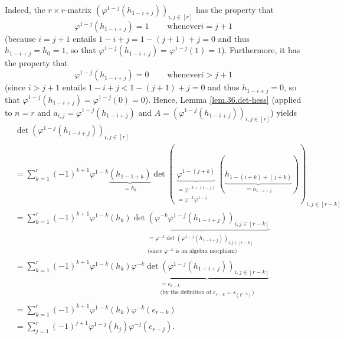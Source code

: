 \documentclass[numbers=enddot,12pt,final,onecolumn,notitlepage]{scrartcl}%
\theoremstyle{definition}
\let\sumnonlimits\sum
\renewcommand{\sum}{\sumnonlimits\limits}
\begin{document}
\begin{enumerate}
Indeed, the $r\times r$-matrix $\left(  \varphi^{1-j}\left(  h_{1-i+j}\right)
\right)  _{i,j\in\left[  r\right]  }$ has the property that%
\[
\varphi^{1-j}\left(  h_{1-i+j}\right)  =1\ \ \ \ \ \ \ \ \ \ \text{whenever
}i=j+1
\]
(because $i=j+1$ entails $1-i+j=1-\left(  j+1\right)  +j=0$ and thus
$h_{1-i+j}=h_{0}=1$, so that $\varphi^{1-j}\left(  h_{1-i+j}\right)
=\varphi^{1-j}\left(  1\right)  =1$). Furthermore, it has the property that%
\[
\varphi^{1-j}\left(  h_{1-i+j}\right)  =0\ \ \ \ \ \ \ \ \ \ \text{whenever
}i>j+1
\]
(since $i>j+1$ entails $1-i+j<1-\left(  j+1\right)  +j=0$ and thus
$h_{1-i+j}=0$, so that $\varphi^{1-j}\left(  h_{1-i+j}\right)  =\varphi
^{1-j}\left(  0\right)  =0$). Hence, Lemma \ref{lem.36.det-hess} (applied to
$n=r$ and $a_{i,j}=\varphi^{1-j}\left(  h_{1-i+j}\right)  $ and $A=\left(
\varphi^{1-j}\left(  h_{1-i+j}\right)  \right)  _{i,j\in\left[  r\right]  }$)
yields%
\begin{align*}
&  \det\left(  \varphi^{1-j}\left(  h_{1-i+j}\right)  \right)  _{i,j\in\left[
r\right]  }\\
&  =\sum_{k=1}^{r}\left(  -1\right)  ^{k+1}\varphi^{1-k}\underbrace{\left(
h_{1-1+k}\right)  }_{=h_{k}}\det\left(  \underbrace{\varphi^{1-\left(
j+k\right)  }}_{\substack{=\varphi^{-k+\left(  1-j\right)  }\\=\varphi
^{-k}\varphi^{1-j}}}\left(  \underbrace{h_{1-\left(  i+k\right)  +\left(
j+k\right)  }}_{=h_{1-i+j}}\right)  \right)  _{i,j\in\left[  r-k\right]  }\\
&  =\sum_{k=1}^{r}\left(  -1\right)  ^{k+1}\varphi^{1-k}\left(  h_{k}\right)
\underbrace{\det\left(  \varphi^{-k}\varphi^{1-j}\left(  h_{1-i+j}\right)
\right)  _{i,j\in\left[  r-k\right]  }}_{\substack{=\varphi^{-k}\det\left(
\varphi^{1-j}\left(  h_{1-i+j}\right)  \right)  _{i,j\in\left[  r-k\right]
}\\\text{(since }\varphi^{-k}\text{ is an algebra morphism)}}}\\
&  =\sum_{k=1}^{r}\left(  -1\right)  ^{k+1}\varphi^{1-k}\left(  h_{k}\right)
\varphi^{-k}\underbrace{\det\left(  \varphi^{1-j}\left(  h_{1-i+j}\right)
\right)  _{i,j\in\left[  r-k\right]  }}_{\substack{=e_{r-k}\\\text{(by the
definition of }e_{r-k}=s_{\left(  1^{r-k}\right)  }\text{)}}}\\
&  =\sum_{k=1}^{r}\left(  -1\right)  ^{k+1}\varphi^{1-k}\left(  h_{k}\right)
\varphi^{-k}\left(  e_{r-k}\right) \\
&  =\sum_{j=1}^{r}\left(  -1\right)  ^{j+1}\varphi^{1-j}\left(  h_{j}\right)
\varphi^{-j}\left(  e_{r-j}\right)  .

\end{align*}
\end{enumerate}
\end{document}
